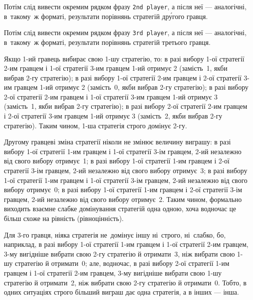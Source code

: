 Потім слід вивести окремим рядком фразу \texttt{2nd~player}, а після неї --- аналогічні, в~такому~ж форматі, результати порівнянь стратегій др\'{у}гого гравця.

Потім слід вивести окремим рядком фразу \texttt{3rd~player}, а після неї --- аналогічні, в~такому~ж форматі, результати порівнянь стратегій третього гравця.

\Examples
\begin{example}
\end{example}

\Note
Якщо {1-ий} гравець вибирає свою {1-шу} стратегію, то: 
в разі вибору {1-ої} стратегії {2-им} гравцем і {1-ої} стратегії {3-им} гравцем {1-ий} отримує 2 (замість~1, якби вибрав {2-гу} стратегію);
в разі вибору {1-ої} стратегії {2-им} гравцем і {2-ої} стратегії {3-им} гравцем {1-ий} отримує 2 (замість~0, якби вибрав {2-гу} стратегію);
в разі вибору {2-ої} стратегії {2-им} гравцем і {1-ої} стратегії {3-им} гравцем {1-ий} отримує 3 (замість~1, якби вибрав {2-гу} стратегію);
в разі вибору {2-ої} стратегії {2-им} гравцем і {2-ої} стратегії {3-им} гравцем {1-ий} отримує 3 (замість~2, якби вибрав {2-гу} стратегію).
Таким чином, {1-ша} стратегія строго домінує {2-гу}.

Другому гравцеві зміна стратегії ніколи не змінює величину виграшу:
в разі вибору {1-ої} стратегії {1-им} гравцем і {1-ої} стратегії {3-ім} гравцем, {2-ий} незалежно від свого вибору отримує~1;
в разі вибору {1-ої} стратегії {1-им} гравцем і {2-ої} стратегії {3-ім} гравцем, {2-ий} незалежно від свого вибору отримує~3;
в разі вибору {1-ої} стратегії {1-им} гравцем і {1-ої} стратегії {3-ім} гравцем, {2-ий} незалежно від свого вибору отримує~0;
в разі вибору {1-ої} стратегії {1-им} гравцем і {2-ої} стратегії {3-ім} гравцем, {2-ий} незалежно від свого вибору отримує~2.
Таким чином, формально виходить взаємне слабке домінування стратегій одна одною, хоча водночас це більш схоже на рівність (рівноцінність).

Для {3-го} гравця, ніяка стратегія не~домінує іншу ні~строго, ні~слабко, бо, наприклад, 
в разі вибору {1-ої} стратегії {1-им} гравцем і {1-ої} стратегії {2-им} гравцем, {3-му} вигідніше вибрати свою {2-гу} стратегію й отримати~3, ніж вибрати свою {1-шу} стратегію й отримати~0;
але, водночас,
в разі вибору {2-ої} стратегії {1-им} гравцем і {1-ої} стратегії {2-им} гравцем, {3-му} вигідніше вибрати свою {1-шу} стратегію й отримати~2, ніж вибрати свою {2-гу} стратегію й отримати~0.
Тобто, в одних ситуаціях строго більший виграш дає одна стратегія, а в інших --- інша.


